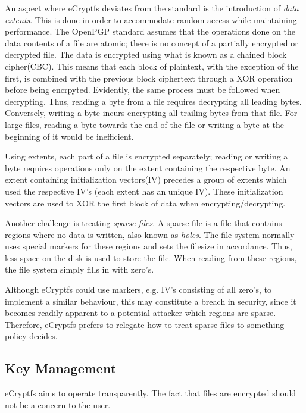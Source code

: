 An aspect where eCryptfs deviates from the standard is the introduction of \textit{data extents}. This is done in order to accommodate random access while maintaining performance. The OpenPGP standard assumes that the operations done on the data contents of a file are atomic; there is no concept of a partially encrypted or decrypted file. The data is encrypted using what is known as a chained block cipher(CBC). This means that each block of plaintext, with the exception of the first, is combined with the previous block ciphertext through a XOR operation before being encrpyted. Evidently, the same process must be followed when decrypting. Thus, reading a byte from a file requires decrypting all leading bytes. Conversely, writing a byte incurs encrypting all trailing bytes from that file. For large files, reading a byte towards the end of the file or writing a byte at the beginning of it would be inefficient.

Using extents, each part of a file is encrypted separately; reading or writing a byte requires operations only on the extent containing the respective byte. An extent containing initialization vectors(IV) precedes a group of extents which used the respective IV's (each extent has an unique IV). These initialization vectors are used to XOR the first block of data when encrypting/decrypting.

Another challenge is treating \textit{sparse files}. A sparse file is a file that contains regions where no data is written, also known as \textit{holes}. The file system normally uses special markers for these regions and sets the filesize in accordance. Thus, less space on the disk is used to store the file. When reading from these regions, the file system simply fills in with zero's.

Although eCryptfs could use markers, e.g. IV's consisting of all zero's, to implement a similar behaviour, this may constitute a breach in security, since it becomes readily apparent to a potential attacker which regions are sparse.
Therefore, eCryptfs prefers to relegate how to treat sparse files to something policy decides.

\subsection{Key Management}
\label{sub-sec:keys-ecryptfs}

eCryptfs aims to operate transparently. The fact that files are encrypted should not be a concern to the user.

